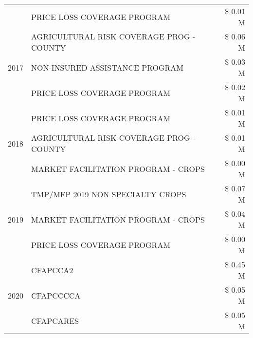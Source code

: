 \begin{tabular}{llr}
 & PRICE LOSS COVERAGE PROGRAM & \$ 0.01 M \\
\cline{1-3}
\multirow[t]{3}{*}{2017} & AGRICULTURAL RISK COVERAGE PROG - COUNTY & \$ 0.06 M \\
 & NON-INSURED ASSISTANCE PROGRAM & \$ 0.03 M \\
 & PRICE LOSS COVERAGE PROGRAM & \$ 0.02 M \\
\cline{1-3}
\multirow[t]{3}{*}{2018} & PRICE LOSS COVERAGE PROGRAM & \$ 0.01 M \\
 & AGRICULTURAL RISK COVERAGE PROG - COUNTY & \$ 0.01 M \\
 & MARKET FACILITATION PROGRAM - CROPS & \$ 0.00 M \\
\cline{1-3}
\multirow[t]{3}{*}{2019} & TMP/MFP 2019 NON SPECIALTY CROPS & \$ 0.07 M \\
 & MARKET FACILITATION PROGRAM - CROPS & \$ 0.04 M \\
 & PRICE LOSS COVERAGE PROGRAM & \$ 0.00 M \\
\cline{1-3}
\multirow[t]{3}{*}{2020} & CFAPCCA2 & \$ 0.45 M \\
 & CFAPCCCCA & \$ 0.05 M \\
 & CFAPCARES & \$ 0.05 M \\
\cline{1-3}
\bottomrule
\end{tabular}

